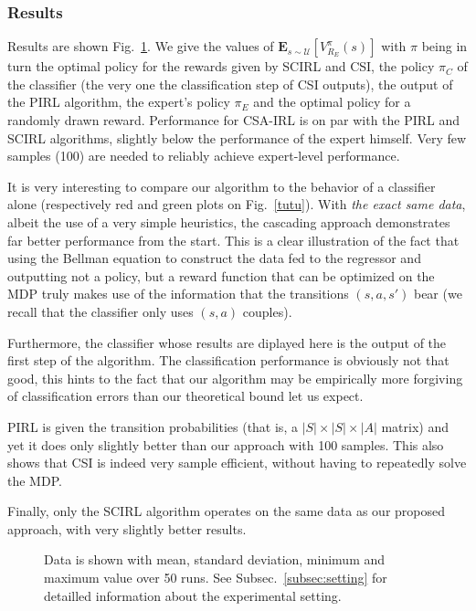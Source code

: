 \documentclass[smallextended]{svjour3}
\begin{document}
\subsubsection{Results}
\label{subsubsec:hresults}
Results are shown Fig.~\ref{fig:Highway}. We give the values of $\mathbf{E}_{s\sim\mathcal{U}}[V^{\pi}_{R_E}(s)]$ with $\pi$ being in turn the optimal policy for the rewards given by SCIRL and CSI, the policy $\pi_C$ of the classifier (the very one the classification step of CSI outputs), the output of the PIRL algorithm, the expert's policy $\pi_E$ and the optimal policy for a randomly drawn reward. Performance for CSA-IRL is on par with the PIRL and SCIRL algorithms, slightly below the performance of the expert himself. Very few samples (100) are needed to reliably achieve expert-level performance.

It is very interesting to compare our algorithm to the behavior of a classifier alone (respectively red and green plots on Fig.~\ref{tutu}). With \emph{the exact same data}, albeit the use of a very simple heuristics, the cascading approach demonstrates far better performance from the start. This is a clear illustration of the fact that using the Bellman equation to construct the data fed to the regressor and outputting not a policy, but a reward function that can be optimized on the MDP truly makes use of the information that the transitions $(s,a,s')$ bear (we recall that the classifier only uses $(s,a)$ couples).

Furthermore, the classifier whose results are diplayed here is the output of the first step of the algorithm. The classification performance is obviously not that good, this hints to the fact that our algorithm may be empirically more forgiving of classification errors than our theoretical bound let us expect.

PIRL is given the transition probabilities (that is, a $|S|\times |S|\times |A|$ matrix) and yet it does only slightly better than our approach with 100 samples. This also shows that CSI is indeed very sample efficient, without having to repeatedly solve the MDP.

Finally, only the SCIRL algorithm operates on the same data as our proposed approach, with very slightly better results.

\begin{figure}

  \caption{Data is shown with mean, standard deviation, minimum and maximum value over 50 runs. See Subsec.~\ref{subsec:setting} for detailled information about the experimental setting.}
  \label{fig:Highway}
\end{figure}
\end{document}
